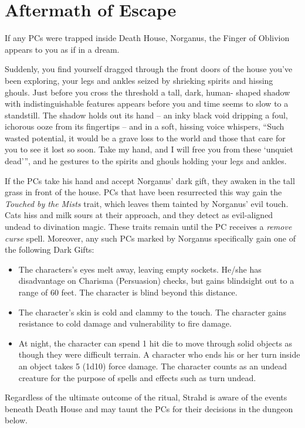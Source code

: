 \documentclass[a4paper,11pt]{article}
\begin{document}
\section*{Aftermath of Escape}
\label{sec:AftermathOfEscape}
If any PCs were trapped inside Death House, Norganus, the Finger of Oblivion appears to you as if in a dream.
\begin{readout}
  Suddenly, you find yourself dragged through the front doors of the house you've been exploring, your legs and 
  ankles seized by shrieking spirits and hissing ghouls. Just before you cross the threshold a tall, dark, human-
  shaped shadow with indistinguishable features appears before you and time seems to slow to a standstill.
  The shadow holds out its hand -- an inky black void dripping a foul, ichorous ooze from its fingertips -- and 
  in a soft, hissing voice whispers, ``Such wasted potential, it would be a grave loss to the world and those 
  that care for you to see it lost so soon. Take my hand, and I will free you from these `unquiet dead'{}'', and 
  he gestures to the spirits and ghouls holding your legs and ankles.
\end{readout}
If the PCs take his hand and accept Norganus' dark gift, they awaken in the tall grass in front of the house. PCs
that have been resurrected this way gain the \textit{Touched by the Mists} trait, which leaves them tainted by
Norganus' evil touch. Cats hiss and milk sours at their approach, and they detect as evil-aligned undead to
divination magic. These traits remain until the PC receives a \textit{remove curse} spell. Moreover, any such PCs
marked by Norganus specifically gain one of the following Dark Gifts:
\begin{itemize}
  \item The characters's eyes melt away, leaving empty sockets. He/she has disadvantage on Charisma (Persuasion) 
  checks, but gains blindsight out to a range of 60 feet. The character is blind beyond this distance.
  \item The character's skin is cold and clammy to the touch. The character gains resistance to cold damage and
  vulnerability to fire damage.
  \item At night, the character can spend 1 hit die to move through solid objects as though they were difficult
  terrain. A character who ends his or her turn inside an object takes 5 (1d10) force damage. The character
  counts as an undead creature for the purpose of spells and effects such as turn undead.
\end{itemize}
Regardless of the ultimate outcome of the ritual, Strahd is aware of the events beneath Death House and may taunt
the PCs for their decisions in the dungeon below.
\end{document}
